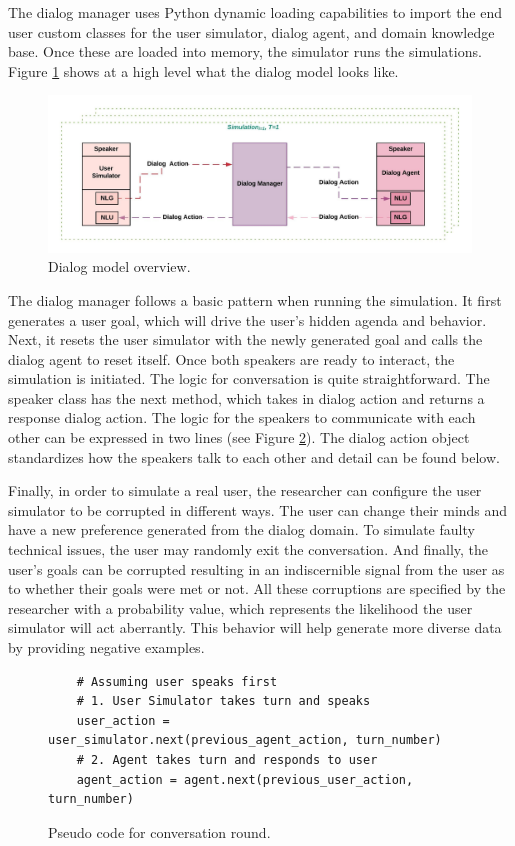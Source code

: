 The dialog manager uses Python dynamic loading capabilities to import the end user custom classes for the user simulator, dialog agent, and domain knowledge base. Once these are loaded into memory, the simulator runs the simulations. Figure 
\ref{fig:dialog_model} shows at a high level what the dialog model looks like. 
\begin{figure}[h!]
	\includegraphics[width=\linewidth]{diagrams/dialog_model.jpeg}
	\caption{ Dialog model overview. }
	\label{fig:dialog_model}
\end{figure}

The dialog manager follows a basic pattern when running the simulation. It first generates a user goal, which will drive the user's hidden agenda and behavior. Next, it resets the user simulator with the newly generated goal and calls the dialog agent to reset itself. Once both speakers are ready to interact, the simulation is initiated. The logic for conversation is quite straightforward. The speaker class has the next method, which takes in dialog action and returns a response dialog action. The logic for the speakers to communicate with each other can be expressed in two lines (see Figure \ref{fig:conv_round}). The dialog action object standardizes how the speakers talk to each other and detail can be found below.  

Finally, in order to simulate a real user, the researcher can configure the user simulator to be corrupted in different ways. The user can change their minds and have a new preference generated from the dialog domain. To simulate faulty technical issues, the user may randomly exit the conversation. And finally, the user's goals can be corrupted resulting in an indiscernible signal from the user as to whether their goals were met or not. All these corruptions are specified by the researcher with a probability value, which represents the likelihood the user simulator will act aberrantly. This behavior will 
help generate more diverse data by providing negative examples.

\begin{figure}[h!]
	\label{fig:conv_round}
	\begin{lstlisting}
	# Assuming user speaks first 
	# 1. User Simulator takes turn and speaks
	user_action = user_simulator.next(previous_agent_action, turn_number)
	# 2. Agent takes turn and responds to user 
	agent_action = agent.next(previous_user_action, turn_number)
	\end{lstlisting}
	\caption{Pseudo code for conversation round.}
\end{figure}

